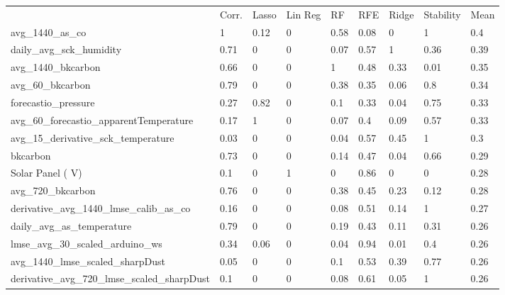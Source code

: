 \begin{table}[!htb]
\centering
\begin{tabular}{lllllllll}
\\
\\
\toprule
     & Corr. & Lasso & Lin Reg & RF   & RFE  & Ridge & Stability & Mean \\
\midrule
avg\_1440\_as\_co                             & 1     & 0.12  & 0          & 0.58 & 0.08 & 0     & 1         & 0.4  \\
daily\_avg\_sck\_humidity                     & 0.71  & 0     & 0          & 0.07 & 0.57 & 1     & 0.36      & 0.39 \\
avg\_1440\_bkcarbon                           & 0.66  & 0     & 0          & 1    & 0.48 & 0.33  & 0.01      & 0.35 \\
avg\_60\_bkcarbon                             & 0.79  & 0     & 0          & 0.38 & 0.35 & 0.06  & 0.8       & 0.34 \\
forecastio\_pressure                          & 0.27  & 0.82  & 0          & 0.1  & 0.33 & 0.04  & 0.75      & 0.33 \\
avg\_60\_forecastio\_apparentTemperature      & 0.17  & 1     & 0          & 0.07 & 0.4  & 0.09  & 0.57      & 0.33 \\
avg\_15\_derivative\_sck\_temperature         & 0.03  & 0     & 0          & 0.04 & 0.57 & 0.45  & 1         & 0.3  \\
bkcarbon                                      & 0.73  & 0     & 0          & 0.14 & 0.47 & 0.04  & 0.66      & 0.29 \\
Solar Panel ( V)                              & 0.1   & 0     & 1          & 0    & 0.86 & 0     & 0         & 0.28 \\
avg\_720\_bkcarbon                            & 0.76  & 0     & 0          & 0.38 & 0.45 & 0.23  & 0.12      & 0.28 \\
derivative\_avg\_1440\_lmse\_calib\_as\_co    & 0.16  & 0     & 0          & 0.08 & 0.51 & 0.14  & 1         & 0.27 \\
daily\_avg\_as\_temperature                   & 0.79  & 0     & 0          & 0.19 & 0.43 & 0.11  & 0.31      & 0.26 \\
lmse\_avg\_30\_scaled\_arduino\_ws            & 0.34  & 0.06  & 0          & 0.04 & 0.94 & 0.01  & 0.4       & 0.26 \\
avg\_1440\_lmse\_scaled\_sharpDust            & 0.05  & 0     & 0          & 0.1  & 0.53 & 0.39  & 0.77      & 0.26 \\
derivative\_avg\_720\_lmse\_scaled\_sharpDust & 0.1   & 0     & 0          & 0.08 & 0.61 & 0.05  & 1         & 0.26 \\

\end{tabular}
\end{table}
